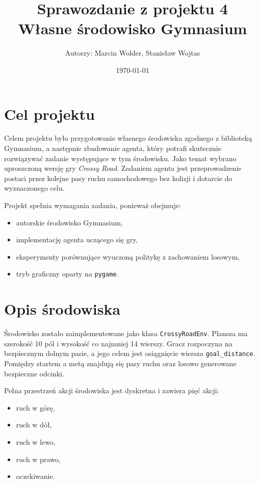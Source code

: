 \documentclass[12pt,a4paper]{article}
\title{Sprawozdanie z projektu 4\\Własne środowisko Gymnasium}
\author{Autorzy: Marcin Wolder, Stanisław Wojtas}
\date{\today}
\begin{document}
\maketitle

\section{Cel projektu}
Celem projektu było przygotowanie własnego środowiska zgodnego z biblioteką Gymnasium, a następnie zbudowanie agenta, który potrafi skutecznie rozwiązywać zadanie występujące w tym środowisku. Jako temat wybrano uproszczoną wersję gry \textit{Crossy Road}. Zadaniem agenta jest przeprowadzenie postaci przez kolejne pasy ruchu samochodowego bez kolizji i dotarcie do wyznaczonego celu.

Projekt spełnia wymagania zadania, ponieważ obejmuje:
\begin{itemize}
    \item autorskie środowisko Gymnasium,
    \item implementację agenta uczącego się gry,
    \item eksperymenty porównujące wyuczoną politykę z zachowaniem losowym,
    \item tryb graficzny oparty na \texttt{pygame}.
\end{itemize}

\section{Opis środowiska}
Środowisko zostało zaimplementowane jako klasa \texttt{CrossyRoadEnv}. Plansza ma szerokość 10 pól i wysokość co najmniej 14 wierszy. Gracz rozpoczyna na bezpiecznym dolnym pasie, a jego celem jest osiągnięcie wiersza \texttt{goal\_distance}. Pomiędzy startem a metą znajdują się pasy ruchu oraz losowo generowane bezpieczne odcinki.

Pełna przestrzeń akcji środowiska jest dyskretna i zawiera pięć akcji:
\begin{itemize}
    \item ruch w górę,
    \item ruch w dół,
    \item ruch w lewo,
    \item ruch w prawo,
    \item oczekiwanie.
\end{itemize}
\end{document}
